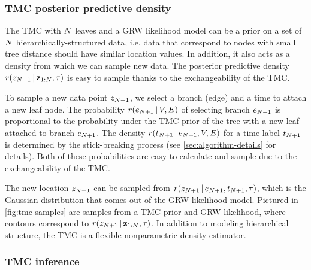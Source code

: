 \subsubsection{TMC posterior predictive density}
The TMC with $N$ leaves and a GRW likelihood model can be a prior on a set of $N$ hierarchically-structured data, i.e. data that correspond to nodes with small tree distance should have similar location values.
In addition, it also acts as a density from which we can sample new data.
The posterior predictive density $r(z_{N + 1} \,|\, \mathbf{z}_{1:N}, \tau)$ is easy to sample thanks to the exchangeability of the TMC.

To sample a new data point $z_{N + 1}$, we select a branch (edge) and a time to attach a new leaf node.
The probability $r(e_{N+1} \,|\, V, E)$ of selecting branch $e_{N+1}$ is proportional to the probability under the TMC prior of the tree with a new leaf attached to branch $e_{N+1}$.
The density $r(t_{N+1} \,|\, e_{N+1}, V, E)$ for a time label $t_{N+1}$ is determined by the stick-breaking process (see \autoref{sec:algorithm-details} for details).
Both of these probabilities are easy to calculate and sample due to the exchangeability of the TMC.

The new location $z_{N + 1}$ can be sampled from  $r(z_{N + 1} \,|\, e_{N + 1}, t_{N + 1}, \tau)$, which is
the Gaussian distribution that comes out of the GRW likelihood model.
Pictured in \autoref{fig:tmc-samples} are samples from a TMC prior and GRW likelihood, where contours correspond to $r(z_{N + 1} \,|\, \mathbf{z}_{1:N}, \tau)$.
In addition to modeling hierarchical structure, the TMC is a flexible nonparametric density estimator.

\subsubsection{TMC inference}


